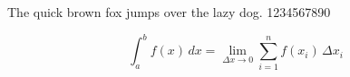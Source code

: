 \documentclass{article}
\newcommand{\pangram}[1]{{#1 The quick brown fox jumps over
  the lazy dog. 1234567890\par}}
\begin{document}
\large
\pangram{\rmfamily}
\[
  \int_a^b \! f(x) \, dx = \lim_{\Delta x \rightarrow 0}
  \sum_{i=1}^{n} f(x_i) \,\Delta x_i
\]
\end{document}
